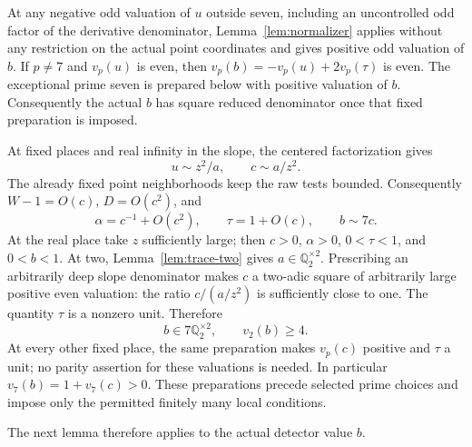 \documentclass[11pt,a4paper]{article}
\newcommand{\Q}{\mathbb Q}\newcommand{\Z}{\mathbb Z}
\begin{document}
At any negative odd valuation of $u$ outside seven, including an
uncontrolled odd factor of the derivative denominator,
Lemma~\ref{lem:normalizer} applies without any restriction on the actual
point coordinates and gives positive odd valuation of $b$.
If $p\ne7$ and $v_p(u)$ is even, then $v_p(b)=-v_p(u)+2v_p(\tau)$
is even. The exceptional prime seven is prepared below with positive
valuation of $b$. Consequently the actual $b$ has square reduced
denominator once that fixed preparation is imposed.

At fixed places and real infinity in the slope, the centered factorization gives
\[
 u\sim z^2/a,\qquad c\sim a/z^2.
\]
The already fixed point neighborhoods keep the raw tests bounded.
Consequently $W-1=O(c)$, $D=O(c^2)$, and
\[
 \alpha=c^{-1}+O(c^2),\qquad \tau=1+O(c),\qquad b\sim7c.
\]
At the real place take $z$ sufficiently large; then $c>0$, $\alpha>0$,
$0<\tau<1$, and $0<b<1$. At two, Lemma~\ref{lem:trace-two} gives $a\in\Q_2^{\times2}$.
Prescribing an arbitrarily deep slope denominator makes $c$ a two-adic
square of arbitrarily large positive even valuation: the ratio
$c/(a/z^2)$ is sufficiently close to one. The quantity $\tau$ is a
nonzero unit. Therefore
\[
 b\in7\Q_2^{\times2},\qquad v_2(b)\ge4.
\]
At every other fixed place, the same preparation makes $v_p(c)$ positive
and $\tau$ a unit; no parity assertion for these valuations is needed. In particular $v_7(b)=1+v_7(c)>0$.
These preparations precede selected prime choices and impose only the
permitted finitely many local conditions.

The next lemma therefore applies to the actual detector value $b$.
\end{document}

